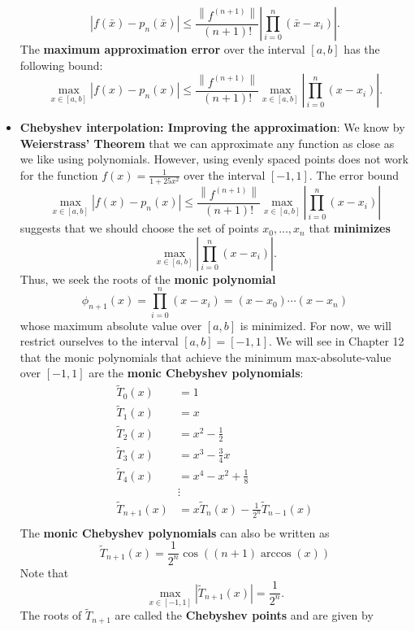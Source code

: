 \documentclass{report}
\begin{document}
\begin{itemize}
    $$\left|f(\bar x) - p_n(\bar x)\right| \leq \frac{\left\|f^{(n+1)}\right\|}{(n+1)!} \left|\prod_{i=0}^n (\bar x-x_i)\right|.$$
    The \textbf{maximum approximation error} over the interval $[a,b]$ has the following bound:
    $$\max_{x \in [a,b]} \left|f(x) - p_n(x)\right| \leq \frac{\left\|f^{(n+1)}\right\|}{(n+1)!} \max_{x \in [a,b]} \left|\prod_{i=0}^n (x-x_i)\right|.$$
\item \textbf{Chebyshev interpolation:  Improving the approximation}:
    We know by \textbf{Weierstrass' Theorem} that we can approximate any function as close as we like using polynomials.
    However, using evenly spaced points does not work for the function $f(x) = \frac{1}{1+25x^2}$ over the interval $[-1,1]$.
    \bigbreak \noindent 
    The error bound 
    $$\max_{x \in [a,b]} \left|f(x) - p_n(x)\right| \leq \frac{\left\|f^{(n+1)}\right\|}{(n+1)!} \max_{x \in [a,b]} \left|\prod_{i=0}^n (x-x_i)\right|$$
    suggests that we should choose the set of points $x_0,\ldots,x_n$ that \textbf{minimizes}
    $$\max_{x \in [a,b]} \left|\prod_{i=0}^n (x-x_i)\right|.$$
    Thus, we seek the roots of the \textbf{monic polynomial} 
    $$\phi_{n+1}(x) = \prod_{i=0}^n (x-x_i) = (x-x_0)\cdots(x-x_n)$$
    whose maximum absolute value over $[a,b]$ is minimized. 
    \bigbreak \noindent 
    For now, we will restrict ourselves to the interval $[a,b] = [-1,1]$.
    \bigbreak \noindent 
    We will see in Chapter 12 that the monic polynomials that achieve the minimum max-absolute-value over $[-1,1]$ are the \textbf{monic Chebyshev polynomials}:
    \begin{align*}
    \tilde T_0(x) &= 1 \\
    \tilde T_1(x) &= x \\
    \tilde T_2(x) &= x^2 - \frac{1}{2} \\
    \tilde T_3(x) &= x^3 - \frac{3}{4}x \\
    \tilde T_4(x) &= x^4 - x^2 + \frac18 \\
    &\vdots\\
    \tilde T_{n+1}(x) &= x \tilde T_{n}(x) - \frac{1}{2^{n}} \tilde T_{n-1}(x)\\
    \end{align*}
    \bigbreak \noindent 
    The \textbf{monic Chebyshev polynomials} can also be written as
    $$\tilde T_{n+1}(x) = \frac{1}{2^{n}}\cos((n+1) \arccos(x))$$
    \bigbreak \noindent 
    Note that
    $$\max_{x \in [-1,1]} \left| \tilde T_{n+1}(x) \right| = \frac{1}{2^n}.$$
    The roots of $\tilde T_{n+1}$ are called the \textbf{Chebyshev points} and are given by

\end{itemize}
\end{document}
